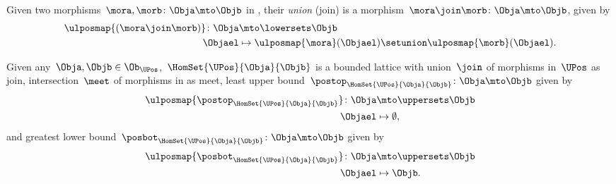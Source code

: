 \begin{definition}
	Given two morphisms~$\mora,\morb\colon \Obja \mto \Objb$ in \LPos, their \emph{union} (join) is a morphism~$\mora \join \morb \colon \Obja \mto \Objb$, given by
	\begin{equation*}
		\begin{aligned}
			\ulposmap{(\mora \join \morb)}\colon \Obja & \mto \lowersets \Objb                                                  \\
			\Objael                                    & \mapsto \ulposmap{\mora}(\Objael) \setunion \ulposmap{\morb}(\Objael).
		\end{aligned}
	\end{equation*}
\end{definition}

\begin{lemma}
	\label{lem:UPos-is-bounded-lattice}
	Given any~$\Obja,\Objb\in \Ob_\UPos$,~$\HomSet{\UPos}{\Obja}{\Objb}$ is a bounded lattice with union~$\join$ of morphisms in~$\UPos$ as join, intersection~$\meet$ of morphisms in \UPos as meet, least upper bound~$\postop_{\HomSet{\UPos}{\Obja}{\Objb}}\colon \Obja \mto \Objb$ given by
	\begin{equation*}
		\begin{aligned}
			\ulposmap{\postop_{\HomSet{\UPos}{\Obja}{\Objb}}}\colon \Obja & \mto \uppersets \Objb \\
			\Objael                                                       & \mapsto \emptyset,
		\end{aligned}
	\end{equation*}
	and greatest lower bound~$\posbot_{\HomSet{\UPos}{\Obja}{\Objb}}\colon \Obja \mto \Objb$ given by
	\begin{equation*}
		\begin{aligned}
			\ulposmap{\posbot_{\HomSet{\UPos}{\Obja}{\Objb}}}\colon \Obja & \mto \uppersets \Objb \\
			\Objael                                                       & \mapsto \Objb.
		\end{aligned}
	\end{equation*}
\end{lemma}
